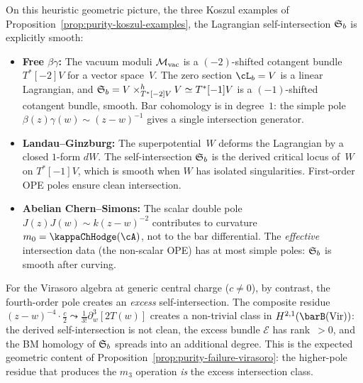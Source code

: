 \begin{remark}
\label{rem:koszul-examples-smooth-intersection}
On this heuristic geometric picture, the three Koszul examples of
Proposition~\ref{prop:purity-koszul-examples}, the Lagrangian
self-intersection $\mathfrak{S}_b$ is explicitly smooth:
\begin{itemize}
\item \textbf{Free $\beta\gamma$:} The vacuum moduli $\mathcal{M}_{\mathrm{vac}}$
 is a $(-2)$-shifted cotangent bundle $T^*[-2]V$ for a vector
 space~$V$. The zero section $\cL_b = V$ is a linear Lagrangian,
 and $\mathfrak{S}_b = V \times_{T^*[-2]V}^h V \simeq T^*[-1]V$
 is a $(-1)$-shifted cotangent bundle, smooth. Bar cohomology
 is in degree~$1$: the simple pole $\beta(z)\gamma(w) \sim
 (z-w)^{-1}$ gives a single intersection generator.

\item \textbf{Landau--Ginzburg:} The superpotential~$W$ deforms the
 Lagrangian by a closed $1$-form $dW$. The self-intersection
 $\mathfrak{S}_b$ is the derived critical locus of~$W$ on
 $T^*[-1]V$, which is smooth when $W$ has isolated
 singularities. First-order OPE poles ensure clean intersection.

\item \textbf{Abelian Chern--Simons:} The scalar double pole
 $J(z)J(w) \sim k(z-w)^{-2}$ contributes to curvature
 $m_0 = \kappaChHodge(\cA)$, not to the bar differential. The
 \emph{effective} intersection data (the non-scalar OPE)
 has at most simple poles: $\mathfrak{S}_b$ is smooth after
 curving.
\end{itemize}

For the Virasoro algebra at generic central charge ($c \neq 0$),
by contrast, the fourth-order pole
creates an \emph{excess} self-intersection. The composite
residue $(z-w)^{-4} \cdot \frac{c}{2} \leadsto
\frac{1}{3!}\partial^3_w[2T(w)]$ creates a non-trivial class in
$H^{2,1}(\barB(\mathrm{Vir}))$: the derived self-intersection
is not clean, the excess bundle $\mathcal{E}$ has rank~$> 0$,
and the BM homology of $\mathfrak{S}_b$ spreads into an additional
degree. This is the expected geometric content of
Proposition~\ref{prop:purity-failure-virasoro}: the
higher-pole residue that produces the $m_3$ operation \emph{is}
the excess intersection class.
\end{remark}

